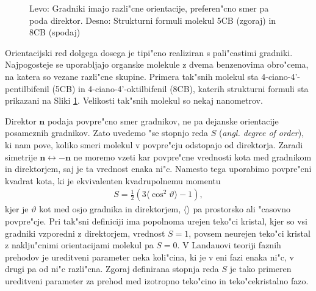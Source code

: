 \documentclass[12pt,twoside,openright,final]{report}
\newcommand{\angl}[1]{(\textit{angl. #1})}
\begin{document}
\begin{figure}[h]
\begin{center}
 \caption{Levo: Gradniki imajo razli"cne orientacije, preferen"cno smer pa poda direktor. Desno: Strukturni formuli molekul 5CB (zgoraj) in 8CB (spodaj)\cite{wiki:lc}}
 \label{fig:nematik-direktor}
 \end{center}
\end{figure}

Orientacijski red dolgega dosega je tipi"cno realiziran s pali"castimi gradniki. Najpogosteje se uporabljajo organske molekule z dvema benzenovima obro"cema, na katera so vezane razli"cne skupine. Primera tak"snih molekul sta 4-ciano-4'-pentilbifenil (5CB) in 4-ciano-4'-oktilbifenil (8CB), katerih strukturni formuli sta prikazani na Sliki \ref{fig:nematik-direktor}. Velikosti tak"snih molekul so nekaj nanometrov. 

Direktor $\mathbf{n}$ podaja povpre"cno smer gradnikov, ne pa dejanske orientacije posameznih gradnikov. 
Zato uvedemo "se stopnjo reda $S$ \angl{degree of order}, ki nam pove, koliko smeri molekul v povpre"cju odstopajo od direktorja. 
Zaradi simetrije $\mathbf{n} \leftrightarrow -\mathbf{n}$ ne moremo vzeti kar povpre"cne vrednosti kota med gradnikom in direktorjem, saj je ta vrednost enaka ni"c. 
Namesto tega uporabimo povpre"cni kvadrat kota, ki je ekvivalenten kvadrupolnemu momentu\cite{kleman}
\begin{align}
 S = \frac{1}{2}\left(3\langle\cos^2\vartheta\rangle-1\right),
\end{align}
kjer je $\vartheta$ kot med osjo gradnika in direktorjem, $\langle\rangle$ pa prostorsko ali "casovno povpre"cje. 
Pri tak"sni definiciji ima popolnoma urejen teko"ci kristal, kjer so vsi gradniki vzporedni z direktorjem, vrednost $S=1$, povsem neurejen teko"ci kristal z naklju"cnimi orientacijami molekul pa $S=0$. 
V Landauovi teoriji faznih prehodov je ureditveni parameter neka koli"cina, ki je v eni fazi enaka ni"c, v drugi pa od ni"c razli"cna. 
Zgoraj definirana stopnja reda $S$ je tako primeren ureditveni parameter za prehod med izotropno teko"cino in teko"cekristalno fazo\cite{degennes}. 
\end{document}
